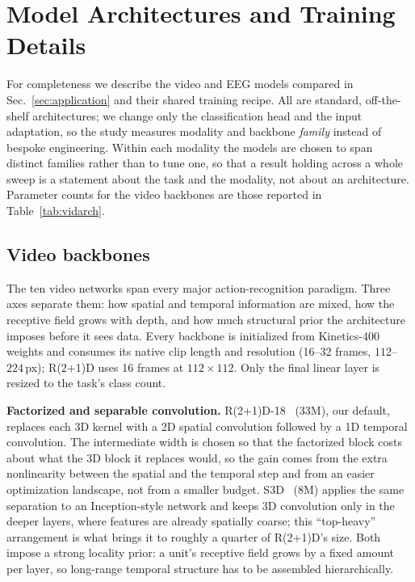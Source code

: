 \section{Model Architectures and Training Details}
\label{sec:arch}

For completeness we describe the video and EEG models compared in
Sec.~\ref{sec:application} and their shared training recipe. All are standard,
off-the-shelf architectures; we change only the classification head and the input
adaptation, so the study measures modality and backbone \emph{family} instead of bespoke engineering. Within each modality the models are chosen to span distinct
families rather than to tune one, so that a result holding across a whole sweep is
a statement about the task and the modality, not about an architecture.
Parameter counts for the video backbones are those reported in
Table~\ref{tab:vidarch}.

\subsection{Video backbones}
\label{sec:arch:video}
The ten video networks span every major action-recognition paradigm. Three axes
separate them: how spatial and temporal information are mixed, how the receptive
field grows with depth, and how much structural prior the architecture imposes
before it sees data. Every backbone is initialized from
Kinetics-400~\cite{kay2017kinetics} weights and consumes its native clip length and
resolution (16--32 frames, $112$--$224$\,px); R(2+1)D uses 16 frames at
$112\times112$. Only the final linear layer is resized to the task's class count.

\noindent\textbf{Factorized and separable convolution.}
R(2+1)D-18~\cite{tran2018r2plus1d} (33M), our default, replaces each 3D kernel with
a 2D spatial convolution followed by a 1D temporal convolution. The intermediate
width is chosen so that the factorized block costs about what the 3D block it
replaces would, so the gain comes from the extra nonlinearity between the spatial
and the temporal step and from an easier optimization landscape, not from a smaller budget. S3D~\cite{xie2018s3d} (8M) applies the same separation to an
Inception-style network and keeps 3D convolution only in the deeper layers, where
features are already spatially coarse; this ``top-heavy'' arrangement is what brings
it to roughly a quarter of R(2+1)D's size. Both impose a strong locality prior: a unit's
receptive field grows by a fixed amount per layer, so long-range temporal structure
has to be assembled hierarchically.


